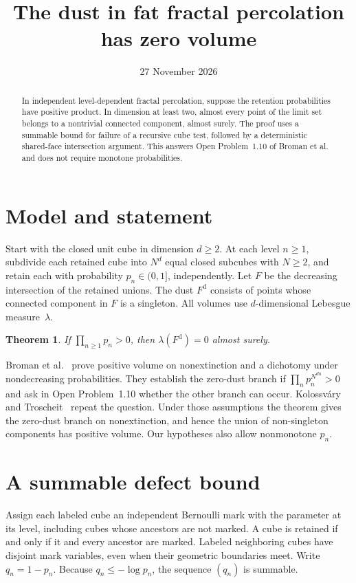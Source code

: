 \documentclass[11pt]{amsart}
\title{The dust in fat fractal percolation has zero volume}
\date{27 November 2026}
\newtheorem{theorem}{Theorem}
\begin{document}
\begin{abstract}
In independent level-dependent fractal percolation, suppose the retention probabilities have positive product. In dimension at least two, almost every point of the limit set belongs to a nontrivial connected component, almost surely. The proof uses a summable bound for failure of a recursive cube test, followed by a deterministic shared-face intersection argument. This answers Open Problem~1.10 of Broman et al. and does not require monotone probabilities.
\end{abstract}
\maketitle

\section{Model and statement}
Start with the closed unit cube in dimension $d\ge2$. At each level $n\ge1$, subdivide each retained cube into $N^d$ equal closed subcubes with $N\ge2$, and retain each with probability $p_n\in(0,1]$, independently. Let $F$ be the decreasing intersection of the retained unions. The dust $F^{\mathrm d}$ consists of points whose connected component in $F$ is a singleton. All volumes use $d$-dimensional Lebesgue measure~$\lambda$.

\begin{theorem}
If $\prod_{n\ge1}p_n>0$, then $\lambda(F^{\mathrm d})=0$ almost surely.
\end{theorem}

Broman et al.~\cite[Theorems~1.7--1.9]{B} prove positive volume on nonextinction and a dichotomy under nondecreasing probabilities. They establish the zero-dust branch if $\prod_n p_n^{N^{dn}}>0$ and ask in Open Problem~1.10 whether the other branch can occur. Kolossv\'ary and Troscheit~\cite[Question~7.3]{KT} repeat the question. Under those assumptions the theorem gives the zero-dust branch on nonextinction, and hence the union of non-singleton components has positive volume. Our hypotheses also allow nonmonotone $p_n$.

\section{A summable defect bound}
Assign each labeled cube an independent Bernoulli mark with the parameter at its level, including cubes whose ancestors are not marked. A cube is retained if and only if it and every ancestor are marked. Labeled neighboring cubes have disjoint mark variables, even when their geometric boundaries meet. Write $q_n=1-p_n$. Because $q_n\le-\log p_n$, the sequence $(q_n)$ is summable.
\end{document}
